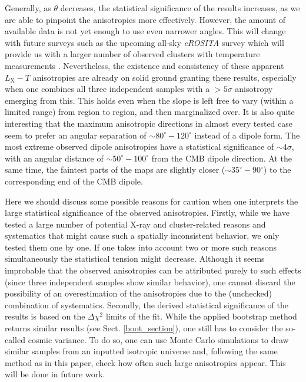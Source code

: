 \documentclass{aa}   %
\begin{document}
\begin{table}[hbtp]
\begin{center}
\begin{tabular}{ c  c  c  c  c  c}
\end{tabular}
\end{center}
\end{table}


Generally, as $\theta$ decreases, the statistical significance of the results increases, as we are able to pinpoint the anisotropies more effectively. However, the amount of available data is not yet enough to use even narrower angles. This will change with future surveys such as the upcoming all-sky \textit{eROSITA} survey which will provide us with a larger number of observed clusters with temperature measurements \citep{borm}. Nevertheless, the existence and consistency of these apparent $L_{\text{X}}-T$ anisotropies are already on solid ground granting these results, especially when one combines all three independent samples with a $>5\sigma$ anisotropy emerging from this. This holds even when the slope is left free to vary (within a limited range) from region to region, and then marginalized over. It is also quite interesting that the maximum anisotropic directions in almost every tested case seem to prefer an angular separation of $\sim 80^{\circ}-120^{\circ}$ instead of a dipole form. The most extreme observed dipole anisotropies have a statistical significance of $\sim 4\sigma$, with an angular distance of $\sim 50^{\circ}-100^{\circ}$ from the CMB dipole direction. At the same time, the faintest parts of the maps are slightly closer ($\sim35^{\circ}-90^{\circ}$) to the corresponding end of the CMB dipole. 

Here we should discuss some possible reasons for caution when one interprets the large statistical significance of the observed anisotropies. Firstly, while we have tested a large number of potential X-ray and cluster-related reasons and systematics that might cause such a spatially inconsistent behavior, we only tested them one by one. If one takes into account two or more such reasons simultaneously the statistical tension might decrease. Although it seems improbable that the observed anisotropies can be attributed purely to such effects (since three independent samples show similar behavior), one cannot discard the possibility of an overestimation of the anisotropies due to the (unchecked) combination of systematics. Secondly, the derived statistical significance of the results is based on the $\Delta \chi^2$ limits of the fit. While the applied bootstrap method returns similar results (see Sect. \ref{boot_section}), one still has to consider the so-called cosmic variance. To do so, one can use Monte Carlo simulations to draw similar samples from an inputted isotropic universe and, following the same method as in this paper, check how often such large anisotropies appear. This will be done in future work. 
\end{document}
